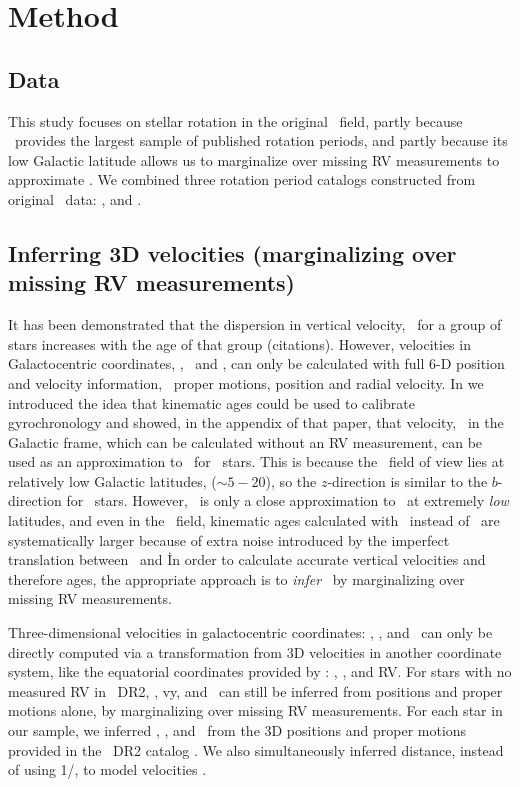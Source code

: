\section{Method}

\subsection{Data}
\label{sec:data}

This study focuses on stellar rotation in the original \kepler\ field, partly
because \kepler\ provides the largest sample of published rotation periods,
and partly because its low Galactic latitude allows us to marginalize over
missing RV measurements to approximate \vz.
We combined three rotation period catalogs constructed from original \kepler\
data: \citet{mcquillan2014}, \citet{santos2019} and \citet{garcia2014}.

\subsection{Inferring 3D velocities (marginalizing over missing RV
measurements)}

It has been demonstrated that the dispersion in vertical velocity, \vz\, for a
group of stars increases with the age of that group (citations).
However, velocities in Galactocentric coordinates, \vx, \vy\ and \vz, can only
be calculated with full 6-D position and velocity information, \ie\ proper
motions, position and radial velocity.
In \citet{angus2020} we introduced the idea that kinematic ages could be used
to calibrate gyrochronology and showed, in the appendix of that paper, that
velocity, \vb\ in the Galactic frame, which can be calculated without an RV
measurement, can be used as an approximation to \vz\ for \kepler\ stars.
This is because the \kepler\ field of view lies at relatively low Galactic
latitudes, ($\sim 5-20$\degrees), so the $z$-direction is similar to the
$b$-direction for \kepler\ stars.
However, \vb\ is only a close approximation to \vz\ at extremely {\it low}
latitudes, and even in the \kepler\ field, kinematic ages calculated with \vb\
instead of \vz\ are systematically larger because of extra noise introduced by
the imperfect translation between \vb\ and \vz\.
In order to calculate accurate vertical velocities and therefore ages, the
appropriate approach is to {\it infer} \vz\  by marginalizing over missing RV
measurements.

Three-dimensional velocities in galactocentric coordinates: \vx, \vy, and \vz\
can only be directly computed via a transformation from 3D velocities in
another coordinate system, like the equatorial coordinates provided by \gaia:
\mura, \mudec, and RV.
For stars with no measured RV in \gaia\ DR2, \vx, vy, and \vz\ can still be
inferred from positions and proper motions alone, by marginalizing over
missing RV measurements.
For each star in our sample, we inferred \vx, \vy, and \vz\ from the 3D
positions and proper motions provided in the \gaia\ DR2 catalog
\citep{brown2011}.
We also simultaneously inferred distance, instead of using 1/\parallax, to
model velocities \citep{bailer-jones2016}.


